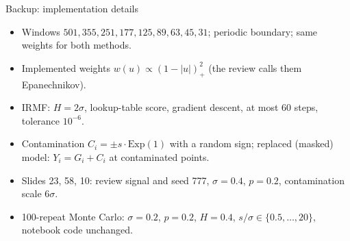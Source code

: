 \documentclass[aspectratio=169,14pt]{beamer}
\begin{document}
\begin{frame}{Backup: implementation details}
    \begin{itemize}
        \setlength{\itemsep}{3mm}
        \item Windows \(501,355,251,177,125,89,63,45,31\); periodic boundary; same weights for both methods.
        \item Implemented weights \(w(u)\propto(1-|u|)_+^2\) (the review calls them Epanechnikov).
        \item IRMF: \(H=2\sigma\), lookup-table score, gradient descent, at most 60 steps, tolerance \(10^{-6}\).
        \item Contamination \(C_i=\pm s\cdot\mathrm{Exp}(1)\) with a random sign; replaced (masked) model: \(Y_i=G_i+C_i\) at contaminated points.
        \item Slides 2\textendash{}3, 5\textendash{}8, 10: review signal and seed 777, \(\sigma=0.4\), \(p=0.2\), contamination scale \(6\sigma\).
        \item 100-repeat Monte Carlo: \(\sigma=0.2\), \(p=0.2\), \(H=0.4\), \(s/\sigma\in\{0.5,\dots,20\}\), notebook code unchanged.
    \end{itemize}
\end{frame}
\end{document}

